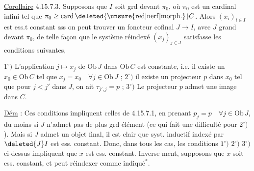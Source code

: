 
\uline{Corollaire} 4.15.7.3. Supposons que $I$ soit grd devant $\pi_0$, où $\pi_0$ est un cardinal infini tel que $\pi_0\geq\operatorname{card}\deleted{\unsure{\mathrm{red}|\mathrm{nerf}|\mathrm{morph.}}} C$. Alors $(x_i)_{i\in I}$ est ess.t constant sss on peut trouver un foncteur cofinal $J\longrightarrow I$, avec $J$  grand devant $\pi_0$, de telle façon que le système réindexé $(x_j)_{j\in J}$ satisfasse les conditions suivantes, 


 $1^\circ)$ L'application $j\mapsto x_j$ de $\mathrm{Ob}\,J$ dans $\mathrm{Ob}\,C$ est constante, i.e. il existe un $x_0\in\mathrm{Ob}\,C$ tel que $x_j=x_0\quad\forall j\in\mathrm{Ob}\,J$ ; $2^\circ)$ il existe un projecteur $p$ dans $x_0$ tel que pour $j<j'$ dans $J$, on ait $\tau_{j',j}=p$ ; $3^\circ)$ Le projecteur $p$ admet une image dans $C$.

\uline{Dém} : Ces conditions impliquent  celles de 4.15.7.1, en prenant $p_j=p\quad\forall j\in\mathrm{Ob}\,J$, du moins si $J$ n'admet pas de plus grd élément (ce qui fait une difficulté pour $2^\circ)$). Mais si $J$ admet un objet final,  il est clair  que  syst. inductif indexé par $\deleted{J}I$  est ess. constant. Donc, dans  tous les cas, les conditions $1^\circ)$ $2^\circ)$ $3^\circ)$ ci-dessus impliquent que $\underline{x}$ est ess. constant. Inverse%
%
%
ment, supposons que $\underline{x}$ soit ess. constant, \deleted{\unsure{$\exists$|$\forall$}}  et     peut réindexer comme indiqué$^{*}$.

